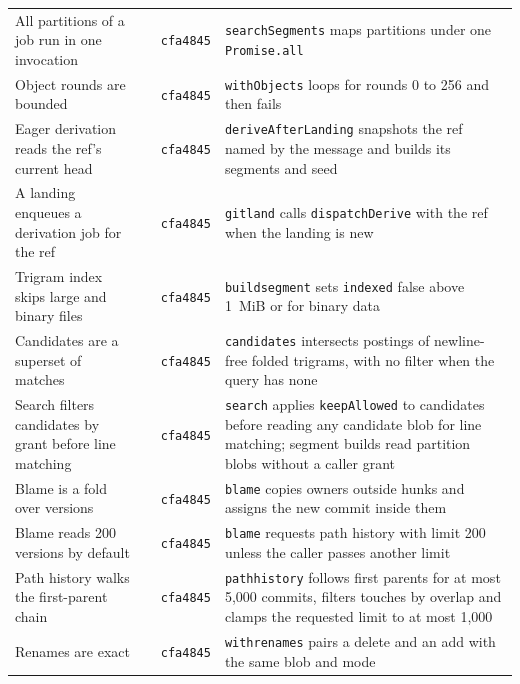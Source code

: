 \documentclass[11pt,letterpaper]{article}
\theoremstyle{definition}
\theoremstyle{remark}
\DeclareRobustCommand{\code}[1]{{\def\_{\textunderscore\allowbreak}\texttt{#1}}}
\begin{document}
\begin{small}
\begin{longtable}{@{}L{3.4cm}L{5.0cm}L{1.3cm}L{5.0cm}@{}}
All partitions of a job run in one invocation &  & \code{cfa4845} & \code{searchSegments} maps partitions under one \code{Promise.all} \\
Object rounds are bounded &  & \code{cfa4845} & \code{withObjects} loops for rounds 0 to 256 and then fails \\
Eager derivation reads the ref's current head &  & \code{cfa4845} & \code{deriveAfterLanding} snapshots the ref named by the message and builds its segments and seed \\
A landing enqueues a derivation job for the ref &  & \code{cfa4845} & \code{git\_land} calls \code{dispatchDerive} with the ref when the landing is new \\
Trigram index skips large and binary files &  & \code{cfa4845} & \code{build\_segment} sets \code{indexed} false above 1~MiB or for binary data \\
Candidates are a superset of matches &  & \code{cfa4845} & \code{candidates} intersects postings of newline-free folded trigrams, with no filter when the query has none \\
Search filters candidates by grant before line matching &  & \code{cfa4845} & \code{search} applies \code{keepAllowed} to candidates before reading any candidate blob for line matching; segment builds read partition blobs without a caller grant \\
Blame is a fold over versions &  & \code{cfa4845} & \code{blame} copies owners outside hunks and assigns the new commit inside them \\
Blame reads 200 versions by default &  & \code{cfa4845} & \code{blame} requests path history with limit 200 unless the caller passes another limit \\
Path history walks the first-parent chain &  & \code{cfa4845} & \code{path\_history} follows first parents for at most 5,000 commits, filters touches by overlap and clamps the requested limit to at most 1,000 \\
Renames are exact &  & \code{cfa4845} & \code{with\_renames} pairs a delete and an add with the same blob and mode \\

\end{longtable}
\end{small}
\end{document}
